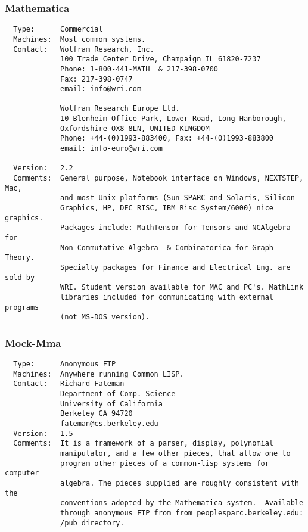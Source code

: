 \documentclass[twoside,11pt]{article}
\begin{document}
\subsubsection{Mathematica}
\begin{verbatim}
  Type:      Commercial
  Machines:  Most common systems.
  Contact:   Wolfram Research, Inc.
             100 Trade Center Drive, Champaign IL 61820-7237
             Phone: 1-800-441-MATH  & 217-398-0700
             Fax: 217-398-0747
             email: info@wri.com

             Wolfram Research Europe Ltd.
             10 Blenheim Office Park, Lower Road, Long Hanborough,
             Oxfordshire OX8 8LN, UNITED KINGDOM
             Phone: +44-(0)1993-883400, Fax: +44-(0)1993-883800
             email: info-euro@wri.com

  Version:   2.2
  Comments:  General purpose, Notebook interface on Windows, NEXTSTEP, Mac,
             and most Unix platforms (Sun SPARC and Solaris, Silicon
             Graphics, HP, DEC RISC, IBM Risc System/6000) nice graphics.
             Packages include: MathTensor for Tensors and NCAlgebra for
             Non-Commutative Algebra  & Combinatorica for Graph Theory.
             Specialty packages for Finance and Electrical Eng. are sold by
             WRI. Student version available for MAC and PC's. MathLink
             libraries included for communicating with external programs
             (not MS-DOS version).
\end{verbatim}

\subsubsection{Mock-Mma}
\begin{verbatim}
  Type:      Anonymous FTP
  Machines:  Anywhere running Common LISP.
  Contact:   Richard Fateman
             Department of Comp. Science
             University of California
             Berkeley CA 94720
             fateman@cs.berkeley.edu
  Version:   1.5
  Comments:  It is a framework of a parser, display, polynomial
             manipulator, and a few other pieces, that allow one to
             program other pieces of a common-lisp systems for computer
             algebra. The pieces supplied are roughly consistent with the
             conventions adopted by the Mathematica system.  Available
             through anonymous FTP from from peoplesparc.berkeley.edu:
             /pub directory.
\end{verbatim}
\end{document}
